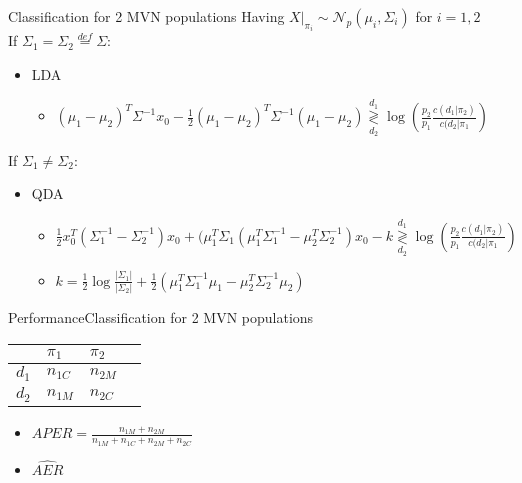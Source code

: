 \documentclass[aspectratio=169,10pt,t]{beamer}
\newcommand\gldec[2]{
	\underset{#2}{\overset{#1}{\gtrless}}
}
\begin{document}
\begin{frame}{Classification for 2 MVN populations}
    Having $X|_{\pi_i} \sim \mathcal{N}_p(\mu_i, \Sigma_i)$ for $i = 1, 2$ \\
    If $\Sigma_1 = \Sigma_2 \overset{def}{=} \Sigma$:
		\pause
    \begin{itemize}
        \item LDA
        \begin{itemize}
            \item $(\mu_1 - \mu_2)^T \Sigma^{-1}x_0 - \frac{1}{2}(\mu_1 - \mu_2)^T \Sigma^{-1}(\mu_1 - \mu_2)  \gldec{d_1}{d_2} \log(\frac{p_2}{p_1} \frac{c(d_1 | \pi_2)}{c(d_2 | \pi_1})$
        \end{itemize}
    \end{itemize}
		\pause
    If $\Sigma_1 \neq \Sigma_2$:
    \begin{itemize}
        \item QDA
        \begin{itemize}
            \item $
							\frac{1}{2} x_0^T(\Sigma_1^{-1} - \Sigma_2^{-1})x_0 + (\mu_1^T\Sigma_1
							\left( \mu_1^{T} \Sigma^{-1}_{1} - \mu_2^{T} \Sigma^{-1}_{2}  \right) x_0 -k
							\gldec{d_1}{d_2}
							\log(\frac{p_2}{p_1} \frac{c(d_1 | \pi_2)}{c(d_2 | \pi_1})
							$
						\item $
							k = \frac{1}{2}  \log \frac{| \Sigma_1 |}{| \Sigma_2 |} +
							\frac{1}{2}  \left( 
								\mu_1^{T}\Sigma_1^{-1}\mu_1
								-
								\mu_2^{T}\Sigma_2^{-1}\mu_2
								 \right) 
							$
        \end{itemize}
    \end{itemize}
\end{frame}

\begin{frame}{Performance}{Classification for 2 MVN populations}

        \begin{table}[h]
        \begin{tabular}{@{}llll@{}}
        \toprule
              & $\pi_1$          & $\pi_2$          \\ \midrule
        $d_1$ & $n_{1C}$ & $n_{2M}$ \\
        $d_2$ & $n_{1M}$ & $n_{2C}$ \\ \midrule 
        \end{tabular}
        \end{table}
				\pause
    \begin{itemize}
        \item $APER = \frac{n_{1M} + n_{2M}}{n_{1M} + n_{1C} + n_{2M} + n_{2C}}$
    \end{itemize}
    \begin{itemize}
        \item $\hat{AER}$ 
    \end{itemize}
\end{frame}
\end{document}
